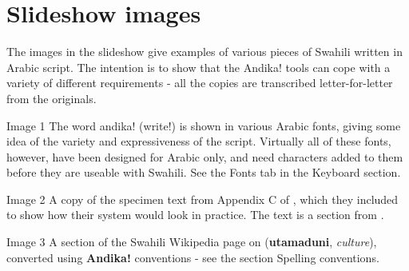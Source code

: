 \documentclass[a4paper,10pt, oneside]{book}
\newcommand\AS[1]{{\citationfont\RLE{#1}}}
\newcommand\Tr[1]{{\fontspec[Scale=0.9, Color=666666]{Linux Biolinum O}#1}}   %
\renewcommand\S[1]{{\fontspec[Color=00BB33, Scale=1]{Linux Biolinum O}#1}}  %
\newcommand\E[1]{{\fontspec[Scale=0.9, Color=666666]{Liberation Serif Italic}#1}}  %
\begin{document}
% 

\chapter{Slideshow images}

The images in the slideshow give examples of various pieces of Swahili written in Arabic script. The intention is to show that the Andika! tools can cope with a variety of different requirements - all the copies are transcribed letter-for-letter from the originals.

Image 1
The word andika! (write!) is shown in various Arabic fonts, giving some idea of the variety and expressiveness of the script. Virtually all of these fonts, however, have been designed for Arabic only, and need characters added to them before they are useable with Swahili. See the Fonts tab in the Keyboard section.

Image 2
A copy of the specimen text from Appendix C of \citet{Omar1997}, which they included to show how their system would look in practice. The text is a section from \citet{Omar1998}.

Image 3
A section of the Swahili Wikipedia page on \AS{أُتَمَدُونِ} (\textbf{utamaduni}, \textit{culture}), converted using \textbf{Andika!} conventions - see the section Spelling conventions.
\end{document}
